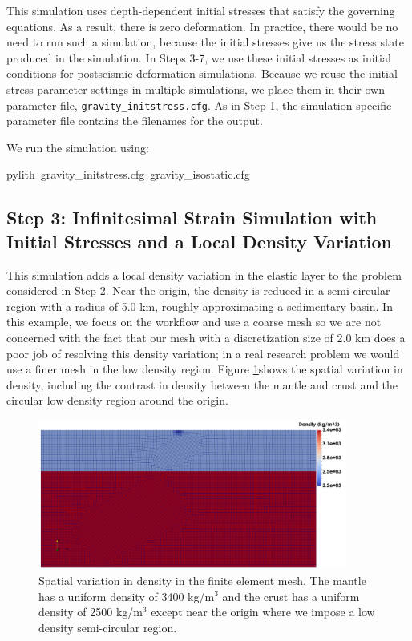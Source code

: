 This simulation uses depth-dependent initial stresses that satisfy
the governing equations. As a result, there is zero deformation. In
practice, there would be no need to run such a simulation, because
the initial stresses give us the stress state produced in the simulation.
In Steps 3-7, we use these initial stresses as initial conditions
for postseismic deformation simulations. Because we reuse the initial
stress parameter settings in multiple simulations, we place them in
their own parameter file, \texttt{gravity\_initstress.cfg}. As in
Step 1, the simulation specific parameter file contains the filenames
for the output.

We run the simulation using:
\begin{lyxcode}
pylith~gravity\_initstress.cfg~gravity\_isostatic.cfg
\end{lyxcode}

\subsection{Step 3: Infinitesimal Strain Simulation with Initial Stresses and
a Local Density Variation}

This simulation adds a local density variation in the elastic layer
to the problem considered in Step 2. Near the origin, the density
is reduced in a semi-circular region with a radius of 5.0 km, roughly
approximating a sedimentary basin. In this example, we focus on the
workflow and use a coarse mesh so we are not concerned with the fact
that our mesh with a discretization size of 2.0 km does a poor job
of resolving this density variation; in a real research problem we
would use a finer mesh in the low density region. Figure \ref{fig:examples:gravity:2d:vardensity:density}shows
the spatial variation in density, including the contrast in density
between the mantle and crust and the circular low density region around
the origin.
\begin{figure}
\begin{centering}
\includegraphics[width=4in]{tutorials/grav2d/figs/gravity_vardensity-density}
\par\end{centering}

\caption{Spatial variation in density in the finite element mesh. The mantle
has a uniform density of 3400 kg/m$^{3}$ and the crust has a uniform
density of 2500 kg/m$^{3}$ except near the origin where we impose
a low density semi-circular region.\label{fig:examples:gravity:2d:vardensity:density}}
\end{figure}


